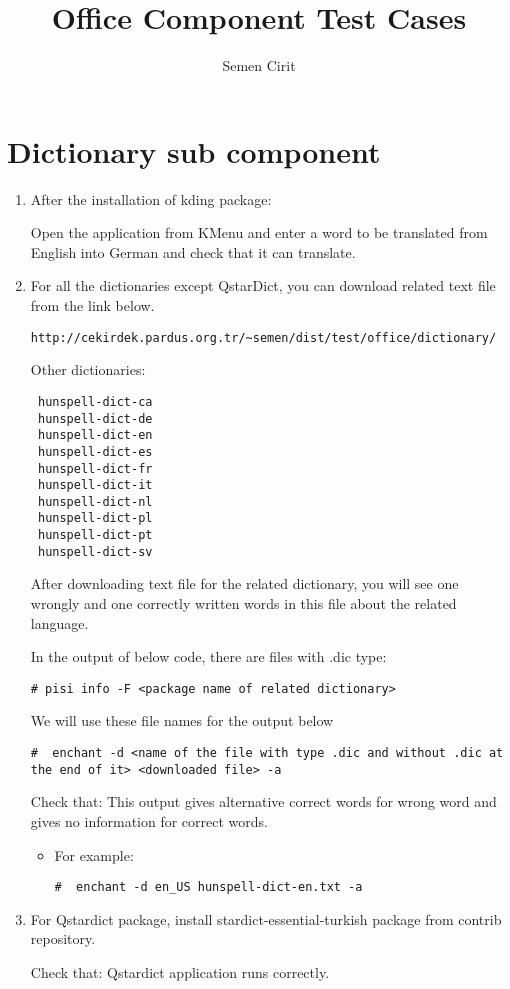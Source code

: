 \documentclass[a4paper,10pt]{article}
\title{Office Component Test Cases}
\author{Semen Cirit}
\begin{document}
\maketitle
\section{Dictionary sub component}
\begin{enumerate}
 \item After the installation of kding package:

Open the application from KMenu and enter a word to be translated from English into German and check that it can translate.
 \item For all the dictionaries except QstarDict, you can download related text file from the link below.
\begin{verbatim}
http://cekirdek.pardus.org.tr/~semen/dist/test/office/dictionary/
\end{verbatim}

Other dictionaries:
\begin{verbatim}
 hunspell-dict-ca
 hunspell-dict-de
 hunspell-dict-en
 hunspell-dict-es
 hunspell-dict-fr
 hunspell-dict-it
 hunspell-dict-nl
 hunspell-dict-pl
 hunspell-dict-pt
 hunspell-dict-sv
\end{verbatim}

After downloading text file for the related dictionary, you will see one wrongly and one correctly written words in this file about the related language.

In the output of below code, there are files with .dic type:
\begin{verbatim}
# pisi info -F <package name of related dictionary> 
\end{verbatim}

We will use these file names for the output below
\begin{verbatim}
#  enchant -d <name of the file with type .dic and without .dic at the end of it> <downloaded file> -a
\end{verbatim}

Check that: This output gives alternative correct words for wrong word and gives no information for correct words.

\begin{itemize}
 \item For example: 
\begin{verbatim}
#  enchant -d en_US hunspell-dict-en.txt -a
\end{verbatim}

\end{itemize}
 \item For Qstardict package, install stardict-essential-turkish package from contrib repository.

	Check that: Qstardict application runs correctly.
\end{enumerate}
\end{document}
